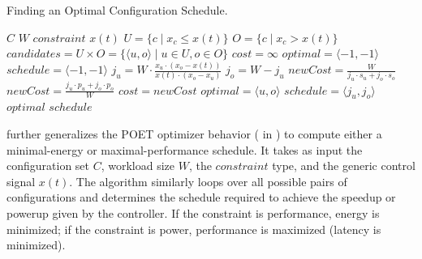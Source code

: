 \begin{algorithm}[t]
  \caption{Finding an Optimal Configuration Schedule.}
  \begin{algorithmic}
    \footnotesize
    \Require $C$ 
    \Require $W$ 
    \Require $constraint$ 
    \Require $x(t)$ 
  \State $U = \{c \mid x_c \le x(t) \}$
    \State $O = \{c \mid x_c > x(t)\}$
    \State $candidates = U \times O = \{\langle u,o \rangle \mid u \in U, o \in O\}$
    \State $cost = \infty$
    \State $optimal = \langle -1,-1 \rangle$
    \State $schedule = \langle -1,-1 \rangle$ \newline
     
    \State $j_u = W \cdot \frac{x_u \cdot (x_o - x(t))}{x(t) \cdot (x_o - x_u)}$
    \State $j_o = W - j_u$
  \State $newCost = \frac{W}{j_u \cdot s_u + j_o \cdot s_o}$
  \Else
  \State $newCost = \frac{j_u \cdot p_u + j_o \cdot p_o}{W}$
  \EndIf
    \State $cost = newCost$
    \State $optimal = \langle u,o \rangle$
    \State $schedule = \langle j_u,j_o \rangle$
    \EndIf
    \EndFor \newline \newline
    \Return $optimal$  \newline
    \Return $schedule$ 
  \end{algorithmic}
  \label{algo:bard-optimal}
\end{algorithm}

 further generalizes the POET optimizer behavior ( in ) to compute either a minimal-energy or maximal-performance schedule.
It takes as input the configuration set $C$, workload size $W$, the $constraint$ type, and the generic control signal $x(t)$.
The algorithm similarly loops over all possible pairs of configurations and determines the schedule required to achieve the speedup or powerup given by the controller.
If the constraint is performance, energy is minimized; if the constraint is power, performance is maximized (latency is minimized).

